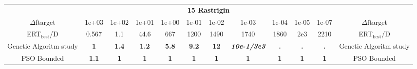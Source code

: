 \begin{tabular}{cccccccccccc}
 & \multicolumn{10}{c}{{\normalsize \textbf{15 Rastrigin}}}\\
$\Delta$ftarget& 1e+03& 1e+02& 1e+01& 1e+00& 1e-01& 1e-02& 1e-03& 1e-04& 1e-05& 1e-07 & $\Delta$ftarget \\
ERT$_{\textrm{best}}$/D& 0.567& 1.1& 44.6& 667& 1200& 1490& 1740& 1860& 2e3& 2210 & ERT$_{\textrm{best}}$/D \\
\hline
Genetic Algoritm study & \textbf{1} & \textbf{1.4} & \textbf{1.2} & \textbf{5.8} & \textbf{9.2} & \textbf{12} & \textbf{\textit{10e-1}\textit{/3e3}} & \textbf{.} & \textbf{.} & \textbf{.} & Genetic Algoritm study \cite{add_an_entry_for_Genetic Algoritm study_in_bbob.bib}\\
PSO Bounded & \textbf{1.1} & \textbf{1} & \textbf{1} & \textbf{1} & \textbf{1} & \textbf{1} & \textbf{1} & \textbf{1} & \textbf{1} & \textbf{1} & PSO Bounded \cite{add_an_entry_for_PSO Bounded_in_bbob.bib}
\end{tabular}
